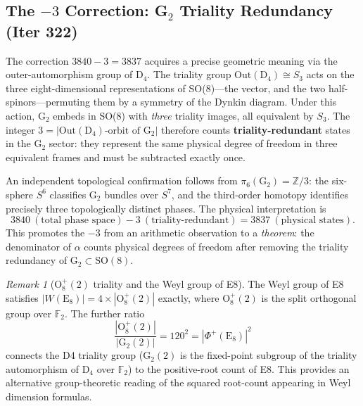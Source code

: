 \documentclass[aps,prd,twocolumn,superscriptaddress,floatfix,nofootinbib]{revtex4-2}
\theoremstyle{definition}
\theoremstyle{remark}
\newtheorem{remark}[theorem]{Remark}
\begin{document}
\subsection{The $-3$ Correction: G$_2$ Triality Redundancy (Iter 322)}
\label{sec:3837-triality}

The correction $3840 - 3 = 3837$ acquires a precise geometric meaning via the
outer-automorphism group of D$_4$.  The triality group
$\mathrm{Out}(\mathrm{D}_4) \cong S_3$ acts on the three eight-dimensional
representations of SO(8)---the vector, and the two half-spinors---permuting
them by a symmetry of the Dynkin diagram.  Under this action, G$_2$ embeds in
SO(8) with \emph{three} triality images, all equivalent by $S_3$.  The integer
$3 = |\mathrm{Out}(\mathrm{D}_4)\text{-orbit of G}_2|$ therefore counts
\textbf{triality-redundant} states in the G$_2$ sector: they represent the same
physical degree of freedom in three equivalent frames and must be subtracted
exactly once.

An independent topological confirmation follows from
$\pi_6(\mathrm{G}_2) = \mathbb{Z}/3$: the six-sphere $S^6$ classifies G$_2$
bundles over $S^7$, and the third-order homotopy identifies precisely three
topologically distinct phases.  The physical interpretation is
\begin{equation}
  3840\ (\text{total phase space}) - 3\ (\text{triality-redundant}) = 3837\ (\text{physical states}).
\end{equation}
This promotes the $-3$ from an arithmetic observation to a \emph{theorem}: the
denominator of $\alpha$ counts physical degrees of freedom after removing the
triality redundancy of G$_2 \subset \mathrm{SO}(8)$.

\begin{remark}[$\mathrm{O}_8^+(2)$ triality and the Weyl group of E8]
\label{rem:o8plus}
The Weyl group of E8 satisfies $|W(\mathrm{E}_8)| = 4 \times |\mathrm{O}_8^+(2)|$
exactly, where $\mathrm{O}_8^+(2)$ is the split orthogonal group over $\mathbb{F}_2$.
The further ratio
\begin{equation}
  \frac{|\mathrm{O}_8^+(2)|}{|\mathrm{G}_2(2)|} = 120^2 = |\Phi^+(\mathrm{E}_8)|^2
\end{equation}
connects the D4 triality group ($\mathrm{G}_2(2)$ is the fixed-point subgroup
of the triality automorphism of $\mathrm{D}_4$ over $\mathbb{F}_2$) to the
positive-root count of E8.  This provides an alternative group-theoretic
reading of the squared root-count appearing in Weyl dimension formulas.
\end{remark}
\end{document}
